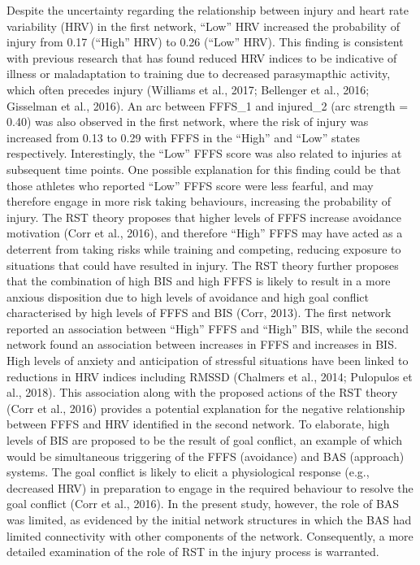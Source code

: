 \documentclass[
  english,
  man,floatsintext]{apa6}
\begin{document}
Despite the uncertainty regarding the relationship between injury and heart rate variability (HRV) in the first network, ``Low'' HRV increased the probability of injury from 0.17 (``High'' HRV) to 0.26 (``Low'' HRV).
This finding is consistent with previous research that has found reduced HRV indices to be indicative of illness or maladaptation to training due to decreased parasymapthic activity, which often precedes injury (Williams et al., 2017; Bellenger et al., 2016; Gisselman et al., 2016).
An arc between FFFS\_1 and injured\_2 (arc strength = 0.40) was also observed in the first network, where the risk of injury was increased from 0.13 to 0.29 with FFFS in the ``High'' and ``Low'' states respectively.
Interestingly, the ``Low'' FFFS score was also related to injuries at subsequent time points. One possible explanation for this finding could be that those athletes who reported ``Low'' FFFS score were less fearful, and may therefore engage in more risk taking behaviours, increasing the probability of injury.
The RST theory proposes that higher levels of FFFS increase avoidance motivation (Corr et al., 2016), and therefore ``High'' FFFS may have acted as a deterrent from taking risks while training and competing, reducing exposure to situations that could have resulted in injury.
The RST theory further proposes that the combination of high BIS and high FFFS is likely to result in a more anxious disposition due to high levels of avoidance and high goal conflict characterised by high levels of FFFS and BIS (Corr, 2013).
The first network reported an association between ``High'' FFFS and ``High'' BIS, while the second network found an association between increases in FFFS and increases in BIS. High levels of anxiety and anticipation of stressful situations have been linked to reductions in HRV indices including RMSSD (Chalmers et al., 2014; Pulopulos et al., 2018).
This association along with the proposed actions of the RST theory (Corr et al., 2016) provides a potential explanation for the negative relationship between FFFS and HRV identified in the second network.
To elaborate, high levels of BIS are proposed to be the result of goal conflict, an example of which would be simultaneous triggering of the FFFS (avoidance) and BAS (approach) systems. The goal conflict is likely to elicit a physiological response (e.g., decreased HRV) in preparation to engage in the required behaviour to resolve the goal conflict (Corr et al., 2016).
In the present study, however, the role of BAS was limited, as evidenced by the initial network structures in which the BAS had limited connectivity with other components of the network.
Consequently, a more detailed examination of the role of RST in the injury process is warranted.
\end{document}
